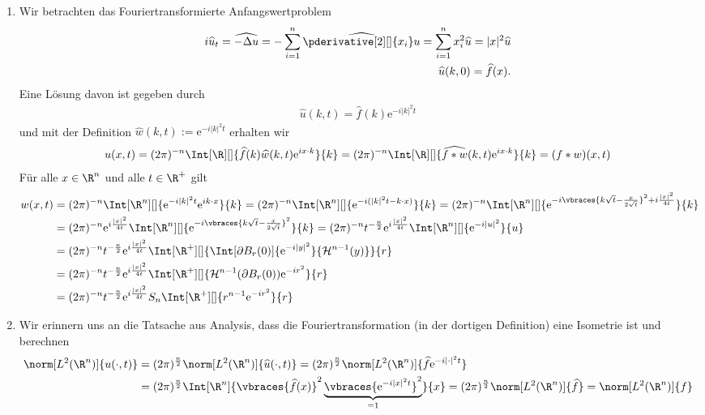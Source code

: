 \begin{solution}
	\phantom{}
	\begin{enumerate}[label = (\roman*)]
		\item Wir betrachten das Fouriertransformierte Anfangswertproblem
			\begin{align*}
			i \widehat{u}_t = \widehat{- \Delta u} = - \sum_{i = 1}^n \widehat{\pderivative[2][]{x_i}u} = \sum_{i = 1}^n x_i^2 \widehat{u} = |x|^2 \widehat{u} \\
			\widehat{u}(k,0) = \widehat{f}(x).
			\end{align*}
			Eine Lösung davon ist gegeben durch
			\begin{align*}
			\widehat{u}(k,t) = \widehat{f}(k) \mathrm{e}^{-i|k|^2t}
			\end{align*}
			und mit der Definition $\widehat{w}(k,t) := \mathrm{e}^{-i|k|^2t}$ erhalten wir
			\begin{align*}
			u(x,t) = (2\pi)^{-n} \Int[\R][]{\widehat{f}(k) \widehat{w}(k,t) \mathrm{e}^{i x \cdot k}}{k} = (2\pi)^{-n} \Int[\R][]{\widehat{f \ast w}(k, t) \mathrm{e}^{i x \cdot k}}{k} = (f \ast w)(x,t)
			\end{align*}
			Für alle $x \in \R^n$ und alle $t \in \R^+$ gilt 
			\begin{align*}
			w(x,t) &= (2 \pi)^{-n} \Int[\R^n][]{\mathrm{e}^{- i |k|^2 t} \mathrm{e}^{i k \cdot x}}{k} = (2 \pi)^{-n} \Int[\R^n][]{\mathrm{e}^{- i (|k|^2 t - k \cdot x)}}{k} = (2 \pi)^{-n} \Int[\R^n][]{\mathrm{e}^{- i \vbraces{k \sqrt{t} - \frac{x}{2 \sqrt{t}}}^2 + i\frac{|x|^2}{4t}}}{k} \\
			&= (2 \pi)^{-n} \mathrm{e}^{i\frac{|x|^2}{4t}} \Int[\R^n][]{\mathrm{e}^{- i \vbraces{k \sqrt{t} - \frac{x}{2 \sqrt{t}}}^2}}{k} = (2 \pi)^{-n} t^{-\frac{n}{2}} \mathrm{e}^{i\frac{|x|^2}{4t}} \Int[\R^n][]{\mathrm{e}^{- i|u|^2}}{u} \\
			&= (2 \pi)^{-n} t^{-\frac{n}{2}} \mathrm{e}^{i\frac{|x|^2}{4t}} \Int[\R^+][]{\Int[\partial B_r(0)]{\mathrm{e}^{- i|y|^2}}{\mathcal{H}^{n - 1}(y)}}{r} \\
			&= (2 \pi)^{-n} t^{-\frac{n}{2}} \mathrm{e}^{i\frac{|x|^2}{4t}}  \Int[\R^+][]{\mathcal{H}^{n - 1}(\partial B_r(0))\mathrm{e}^{- ir^2}}{r} \\
			&= (2 \pi)^{-n} t^{-\frac{n}{2}} \mathrm{e}^{i\frac{|x|^2}{4t}} S_n  \Int[\R^+][]{r^{n - 1}\mathrm{e}^{- ir^2}}{r}
			\end{align*}
		\item Wir erinnern uns an die Tatsache aus Analysis, dass die Fouriertransformation (in der dortigen Definition) eine Isometrie ist und berechnen
		\begin{align*}
		\norm[L^2(\R^n)]{u(\cdot, t)} &= (2 \pi)^{\frac{n}{2}} \norm[L^2(\R^n)]{\widehat{u}(\cdot, t)} = (2 \pi)^{\frac{n}{2}} \norm[L^2(\R^n)]{\widehat{f} \mathrm{e}^{-i |\cdot|^2 t}} \\
		&= (2 \pi)^{\frac{n}{2}} \Int[\R^n]{\vbraces{\widehat{f}(x)}^2 \underbrace{\vbraces{\mathrm{e}^{-i |x|^2 t}}^2}_{= 1}}{x} = (2 \pi)^{\frac{n}{2}} \norm[L^2(\R^n)]{\widehat{f}} = \norm[L^2(\R^n)]{f}
		\end{align*}
	\end{enumerate}

\end{solution}

